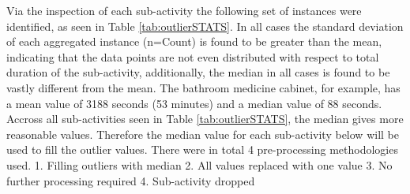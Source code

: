 \documentclass[11pt,]{article}
\begin{document}
Via the inspection of each sub-activity the following set of instances
were identified, as seen in Table \ref{tab:outlierSTATS}. In all cases
the standard deviation of each aggregated instance (n=Count) is found to
be greater than the mean, indicating that the data points are not even
distributed with respect to total duration of the sub-activity,
additionally, the median in all cases is found to be vastly different
from the mean. The bathroom medicine cabinet, for example, has a mean
value of 3188 seconds (53 minutes) and a median value of 88 seconds.
Accross all sub-activities seen in Table \ref{tab:outlierSTATS}, the
median gives more reasonable values. Therefore the median value for each
sub-activity below will be used to fill the outlier values. There were
in total 4 pre-processing methodologies used. 1. Filling outliers with
median 2. All values replaced with one value 3. No further processing
required 4. Sub-activity dropped
\end{document}
